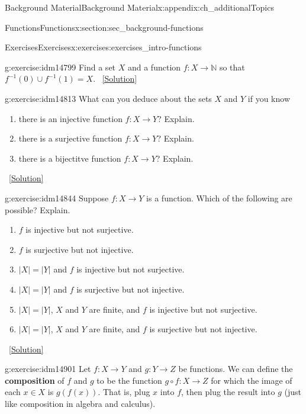 \documentclass[oneside,10pt,]{book}
\newcommand{\terminology}[1]{\textbf{#1}}
\numberwithin{equation}{chapter}
\def\N{\mathbb N}
\def\inv{^{-1}}
\begin{document}
\begin{appendixptx}{Background Material}{}{Background Material}{}{}{x:appendix:ch_additionalTopics}
\begin{sectionptx}{Functions}{}{Functions}{}{}{x:section:sec_background-functions}
\begin{exercises-subsection}{Exercises}{}{Exercises}{}{}{x:exercises:exercises_intro-functions}
\begin{divisionexercise}{10}{}{}{g:exercise:idm14799}%
Find a set \(X\) and a function \(f:X \to \N\) so that \(f\inv(0) \cup f\inv(1) = X\).%
\qquad~\hfill{\tiny\hyperlink{g:solution:idm14805-main}{[Solution]}}\end{divisionexercise}%
\begin{divisionexercise}{11}{}{}{g:exercise:idm14813}%
What can you deduce about the sets \(X\) and \(Y\) if you know \textellipsis{}%
\begin{enumerate}[label=(\alph*)]
\item{}there is an injective function \(f:X \to Y\)? Explain.%
\item{}there is a surjective function \(f:X \to Y\)? Explain.%
\item{}there is a bijectitve function \(f:X \to Y\)? Explain.%
\end{enumerate}
%
\qquad~\hfill{\tiny\hyperlink{g:solution:idm14829-main}{[Solution]}}\end{divisionexercise}%
\begin{divisionexercise}{12}{}{}{g:exercise:idm14844}%
Suppose \(f:X \to Y\) is a function. Which of the following are possible? Explain.%
\begin{enumerate}[label=(\alph*)]
\item{}\(f\) is injective but not surjective.%
\item{}\(f\) is surjective but not injective.%
\item{}\(|X| = |Y|\) and \(f\) is injective but not surjective.%
\item{}\(|X| = |Y|\) and \(f\) is surjective but not injective.%
\item{}\(|X| = |Y|\), \(X\) and \(Y\) are finite, and \(f\) is injective but not surjective.%
\item{}\(|X| = |Y|\), \(X\) and \(Y\) are finite, and \(f\) is surjective but not injective.%
\end{enumerate}
%
\qquad~\hfill{\tiny\hyperlink{g:solution:idm14869-main}{[Solution]}}\end{divisionexercise}%
\begin{divisionexercise}{13}{}{}{g:exercise:idm14901}%
Let \(f:X \to Y\) and \(g:Y \to Z\) be functions.  We can define the \terminology{composition} of \(f\) and \(g\) to be the function \(g\circ f:X \to Z\) for which the image of each \(x \in X\) is \(g(f(x))\).  That is, plug \(x\) into \(f\), then plug the result into \(g\) (just like composition in algebra and calculus).%
\par

\end{divisionexercise}
\end{exercises-subsection}
\end{sectionptx}
\end{appendixptx}
\end{document}
